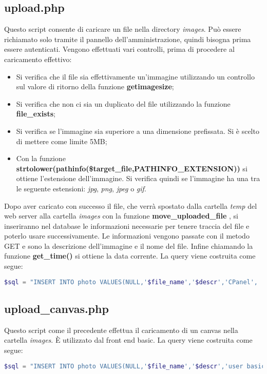 \subsection{upload.php}
Questo script consente di caricare un file nella directory \textit{images}. Può essere richiamato solo tramite il pannello dell'amministrazione, quindi bisogna prima essere autenticati. \newline Vengono effettuati vari controlli, prima di procedere al caricamento effettivo:
\begin{itemize}
\item Si verifica  che il file sia effettivamente un'immagine utilizzando un controllo sul valore di ritorno della funzione \textbf{getimagesize};
\item Si verifica che non ci sia un duplicato del file utilizzando la funzione \textbf{file\_exists}; 
\item Si verifica se l'immagine sia superiore a una dimensione prefissata. Si è scelto di mettere come limite 5MB;
\item Con la funzione \newline \textbf{strtolower(pathinfo(\$target\_file,PATHINFO\_EXTENSION))} si ottiene l'estensione dell'immagine. Si verifica quindi se l'immagine ha una tra le seguente estensioni: \textit{jpg}, \textit{png}, \textit{jpeg} o \textit{gif}.
\end{itemize}
Dopo aver caricato con successo il file, che verrà spostato dalla cartella \textit{temp} del web server alla cartella \textit{images} con la funzione \textbf{move\_uploaded\_file }, si inseriranno nel database le informazioni necessarie per tenere traccia del file e poterlo usare successivamente. \newline
Le informazioni vengono passate con il metodo GET e sono la descrizione dell'immagine e il nome del file. Infine chiamando la funzione \textbf{get\_time()} si ottiene la data corrente. \newline
La query viene costruita come segue:
\begin{lstlisting}[language=PHP]
$sql = "INSERT INTO photo VALUES(NULL,'$file_name','$descr','CPanel', '$time')"; 
\end{lstlisting}

\subsection{upload\_canvas.php}
Questo script come il precedente effettua il caricamento di un canvas nella cartella \textit{images}. È utilizzato dal front end basic.
La query viene costruita come segue:
\begin{lstlisting}[language=PHP]
$sql = "INSERT INTO photo VALUES(NULL,'$file_name','$descr','user basic', '$time')";
\end{lstlisting}

